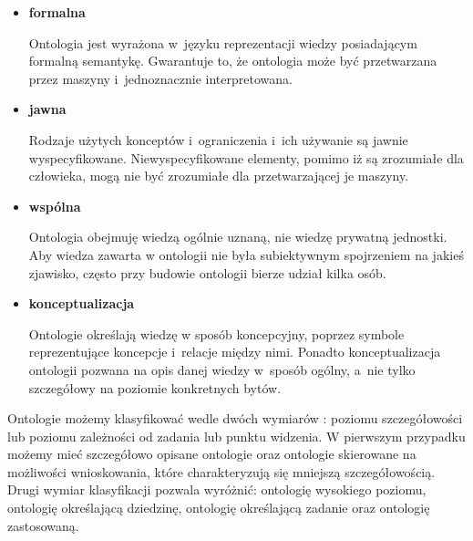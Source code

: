 \begin{itemize}
 \item {\bf formalna} 

Ontologia jest wyrażona  w~języku reprezentacji wiedzy posiadającym formalną semantykę. Gwarantuje to, że ontologia może być przetwarzana przez maszyny i~jednoznacznie 
interpretowana.

\item {\bf jawna}

Rodzaje użytych konceptów i~ograniczenia i~ich używanie są jawnie wyspecyfikowane. Niewyspecyfikowane elementy, pomimo iż są zrozumiałe dla człowieka, mogą nie być zrozumiałe 
dla przetwarzającej je maszyny. 

\item {\bf wspólna }

Ontologia obejmuję wiedzą ogólnie uznaną, nie wiedzę prywatną jednostki.  Aby wiedza zawarta w ontologii nie była 
subiektywnym spojrzeniem na jakieś zjawisko, często przy budowie ontologii bierze udział kilka osób.

\item {\bf konceptualizacja }

Ontologie określają wiedzę w sposób koncepcyjny, poprzez symbole reprezentujące koncepcje i~relacje między nimi. Ponadto konceptualizacja ontologii pozwana na opis danej wiedzy
w~sposób ogólny, a~nie tylko szczegółowy na poziomie konkretnych bytów. 

% 
 
\end{itemize}

\par
 Ontologie możemy klasyfikować wedle dwóch wymiarów \cite{knowledge}: poziomu szczegółowości lub poziomu zależności od zadania lub punktu widzenia. W pierwszym 
przypadku możemy mieć szczegółowo opisane ontologie oraz ontologie skierowane na możliwości wnioskowania, które charakteryzują się mniejszą szczegółowością. Drugi 
wymiar klasyfikacji pozwala wyróżnić: ontologię wysokiego poziomu, ontologię określającą dziedzinę, ontologię określającą zadanie oraz ontologię zastosowaną. 


